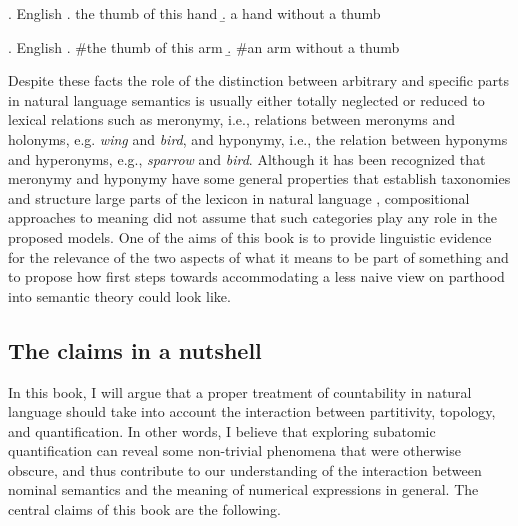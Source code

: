 \ex. English \citep[p. 513; adapted]{champollion_krifka2016mereology}\label{ex:structured-parts-transitivity}
\a. the thumb of this hand\label{ex:structured-parts-transitivity-thumb}
\b. a hand without a thumb\label{ex:structured-parts-transitivity-hand}

\ex. English \citep[p. 513; adapted]{champollion_krifka2016mereology}\label{ex:structured-parts-intransitivity}
\a. \#the thumb of this arm\label{ex:structured-parts-intransitivity-thumb}
\b. \#an arm without a thumb\label{ex:structured-parts-intransitivity-arm}

Despite these facts the role of the distinction between arbitrary and specific parts in natural language semantics is usually either totally neglected or reduced to lexical relations such as meronymy, i.e., relations between meronyms and holonyms, e.g. \textit{wing} and \textit{bird}, and hyponymy, i.e., the relation between hyponyms and hyperonyms, e.g., \textit{sparrow} and \textit{bird}. Although it has been recognized that meronymy and hyponymy have some general properties that establish taxonomies and structure large parts of the lexicon in natural language \citep{cruse1986lexical}, compositional approaches to meaning did not assume that such categories play any role in the proposed models. One of the aims of this book is to provide linguistic evidence for the relevance of the two aspects of what it means to be part of something and to propose how first steps towards accommodating a less naive view on parthood into semantic theory could look like.

\subsection{The claims in a nutshell}\label{sec:the-claims-in-a-nutshell}

In this book, I will argue that a proper treatment of countability in natural language should take into account the interaction between partitivity, topology, and quantification. In other words, I believe that exploring subatomic quantification can reveal some non-trivial phenomena that were otherwise obscure, and thus contribute to our understanding of the interaction between nominal semantics and the meaning of numerical expressions in general. The central claims of this book are the following. 


